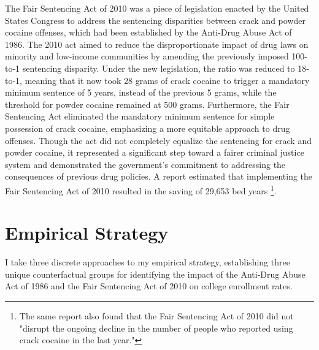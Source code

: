 \documentclass{article}
\begin{document}
The Fair Sentencing Act of 2010 was a piece of legislation enacted by the United States Congress to address the sentencing disparities between crack and powder cocaine offenses, which had been established by the Anti-Drug Abuse Act of 1986. The 2010 act aimed to reduce the disproportionate impact of drug laws on minority and low-income communities by amending the previously imposed 100-to-1 sentencing disparity. Under the new legislation, the ratio was reduced to 18-to-1, meaning that it now took 28 grams of crack cocaine to trigger a mandatory minimum sentence of 5 years, instead of the previous 5 grams, while the threshold for powder cocaine remained at 500 grams. Furthermore, the Fair Sentencing Act eliminated the mandatory minimum sentence for simple possession of crack cocaine, emphasizing a more equitable approach to drug offenses. Though the act did not completely equalize the sentencing for crack and powder cocaine, it represented a significant step toward a fairer criminal justice system and demonstrated the government's commitment to addressing the consequences of previous drug policies. A \cite{ussc} report estimated that implementing the Fair Sentencing Act of 2010 resulted in the saving of 29,653 bed years \footnote{The same \cite{ussc} report also found that the Fair Sentencing Act of 2010 did not "disrupt the ongoing decline in the number of people who reported using crack cocaine in the last year."}. 


\section{Empirical Strategy}

I take three discrete approaches to my empirical strategy, establishing three unique counterfactual groups for identifying the impact of the Anti-Drug Abuse Act of 1986 and the Fair Sentencing Act of 2010 on college enrollment rates. 
\end{document}
